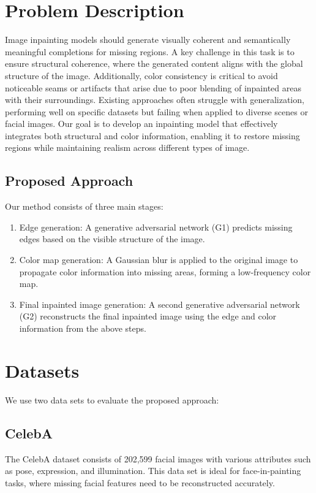 \documentclass[10pt,twocolumn,letterpaper]{article}
\begin{document}
\section{Problem Description}
Image inpainting models should generate visually coherent and semantically meaningful completions for missing regions. A key challenge in this task is to ensure structural coherence, where the generated content aligns with the global structure of the image. Additionally, color consistency is critical to avoid noticeable seams or artifacts that arise due to poor blending of inpainted areas with their surroundings. Existing approaches often struggle with generalization, performing well on specific datasets but failing when applied to diverse scenes or facial images. Our goal is to develop an inpainting model that effectively integrates both structural and color information, enabling it to restore missing regions while maintaining realism across different types of image.

\subsection{Proposed Approach}
Our method consists of three main stages:

\begin{enumerate}
    \item Edge generation: A generative adversarial network (G1) predicts missing edges based on the visible structure of the image.
    \item Color map generation: A Gaussian blur is applied to the original image to propagate color information into missing areas, forming a low-frequency color map.
    \item Final inpainted image generation: A second generative adversarial network (G2) reconstructs the final inpainted image using the edge and color information from the above steps.
\end{enumerate}

\section{Datasets}
We use two data sets to evaluate the proposed approach:

\subsection{CelebA}
The CelebA dataset \cite{liu2015faceattributes} consists of 202,599 facial images with various attributes such as pose, expression, and illumination. This data set is ideal for face-in-painting tasks, where missing facial features need to be reconstructed accurately.
\end{document}
